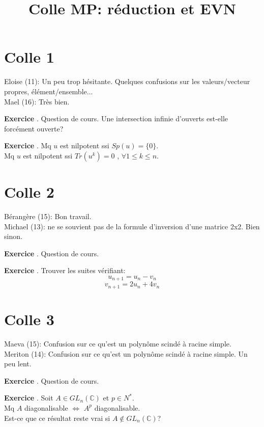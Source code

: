 \documentclass[10pt,a4paper]{article}
\title{Colle MP: réduction et EVN}
\newcounter{question}
\newcounter{exo}
\newenvironment{exo}{\vspace{0.5cm}\setcounter{question}{0}\addtocounter{exo}{1} \noindent \textbf{Exercice \theexo}. \normalsize }{\par}
\begin{document}
	\maketitle
	
	\section*{Colle 1}
	\setcounter{exo}{0}
	Eloise (11): Un peu trop hésitante. Quelques confusions sur les valeurs/vecteur propres, élément/ensemble...\\
	Mael (16): Très bien.\\
	
	
	\begin{exo}
		Question de cours. Une intersection infinie d'ouverts est-elle forcément ouverte?
	\end{exo}
	
	\begin{exo} %
		Mq $u$ est nilpotent ssi $Sp(u) = \lbrace 0 \rbrace$.\\
		Mq $u$ est nilpotent ssi $Tr(u^k) = 0$ , $\forall 1 \leq k \leq n$.
	\end{exo}
	
	\section*{Colle 2}
	Bérangère (15): Bon travail.\\
	Michael (13): ne se souvient pas de la formule d'inversion d'une matrice 2x2. Bien sinon.\\
	
	\begin{exo}
		Question de cours.
	\end{exo}
	
	\begin{exo}
		Trouver les suites vérifiant:
		$$u_{n+1} = u_n - v_n$$
		$$v_{n+1} = 2u_n + 4v_n$$
	\end{exo}

	\section*{Colle 3}
	\setcounter{exo}{0}
	Maeva (15): Confusion sur ce qu'est un polynôme scindé à racine simple.\\
	Meriton (14): Confusion sur ce qu'est un polynôme scindé à racine simple. Un peu lent.\\
	
	\begin{exo}
		Question de cours.
	\end{exo}

	\begin{exo} %
		Soit $A \in GL_n(\mathbb{C})$ et $p \in N^*$. \\
		Mq $A$ diagonalisable $\Longleftrightarrow$ $A^p$ diagonalisable.\\
		Est-ce que ce résultat reste vrai si $A \notin GL_n(\mathbb{C})$?
	\end{exo}
	 
\end{document}
